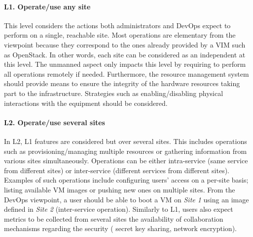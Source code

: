 \vspace*{-.3cm}
\paragraph{L1. Operate/use any site}
This level
considers the actions both administrators and DevOps expect to perform on a
single, reachable site.
%
Most operations are elementary from the \edge viewpoint because they correspond
to the ones already provided by a VIM such as OpenStack.
In other words, each \edge site can be considered as an independent \cloud at
this level. The unmanned aspect only impacts this level by requiring to perform
all operations remotely if needed.
Furthermore, the resource management system should provide means to
ensure the integrity of the hardware resources taking part to the \edge
infrastructure. Strategies such as enabling/disabling physical
interactions with the equipment should be considered.




\vspace*{-.3cm}
\paragraph{L2. Operate/use several sites}

In L2, L1 features are considered but over several sites. This
includes operations such as provisioning/managing multiple resources or
gathering information from various sites simultaneously.
Operations can be either intra-service (same service from different sites) or
inter-service (different services from different sites). Examples of 
such operations include configuring users'
access on a per-site basis; listing available VM images or pushing new
ones on multiple sites. From the
DevOps viewpoint, a user should be able to boot a VM on \emph{Site 1}
using an image defined in \emph{Site 2}
(inter-service operation). Similarly to L1, users also expect metrics to be collected
from several sites the availability of collaboration mechanisms regarding the security (\eg
secret key sharing, network encryption).

